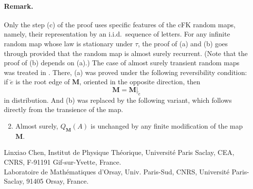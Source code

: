 \documentclass[a4paper]{article}
\newcommand*{\map}{\mathbf}
\newcommand*{\m}{\map{M}}
\newcommand*{\QM}{Q_{\map{M}}}
\begin{document}
\paragraph{Remark.} Only the step (c) of the proof uses specific features of the cFK random maps, namely, their representation by an i.i.d.\ sequence of letters.
For any infinite random map whose law is stationary under $\tau$, the proof of (a) and (b) goes through provided that the random map is almost surely recurrent. (Note that the proof of (b) depends on (a).)
The case of almost surely transient random maps was treated in \cite[Prop.\ 10]{PSHIT}.
There, (a) was proved under the following reversibility condition: if $\overleftarrow{e}$ is the root edge of $\map{M}$, oriented in the opposite direction, then
$$
	\m = \m|_{\overleftarrow{e}}
$$
in distribution.
And (b) was replaced by the following variant, which follows directly from the transience of the map.
\begin{enumerate}[label=(\alph*')]
\setcounter{enumi}{1}
\item	Almost surely, $\QM(A)$ is unchanged by any finite modification of the map $\m$.
\end{enumerate}


{%
}

\bigskip
\noindent
Linxiao Chen, Institut de Physique Théorique, Université Paris Saclay, CEA, CNRS, F-91191 Gif-sur-Yvette, France.\\
Laboratoire de Mathématiques d'Orsay, Univ. Paris-Sud, CNRS, Université Paris-Saclay, 91405 Orsay, France.
\end{document}
